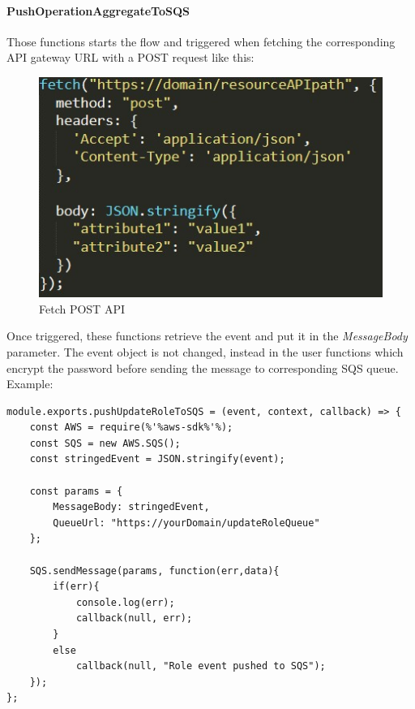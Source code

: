 \paragraph{PushOperationAggregateToSQS} \Spazio
Those functions starts the flow and triggered when fetching the corresponding API gateway URL with a POST request like this: \\
\begin{figure} [H]
	\centering
	\includegraphics[scale=1.2]{../Img/fetchPOST}
	\caption{Fetch POST API}\label{}
\end{figure}
Once triggered, these functions retrieve the event and put it in the \emph{MessageBody} parameter. The event object is not changed, instead in the user functions which encrypt the password before sending the message to corresponding SQS queue.\\
Example:
\begin{lstlisting}[escapechar=\%]
module.exports.pushUpdateRoleToSQS = (event, context, callback) => {
	const AWS = require(%'%aws-sdk%'%);
	const SQS = new AWS.SQS();
	const stringedEvent = JSON.stringify(event);
	
	const params = {
		MessageBody: stringedEvent,
		QueueUrl: "https://yourDomain/updateRoleQueue"
	};
	
	SQS.sendMessage(params, function(err,data){
		if(err){
			console.log(err);
			callback(null, err);
		}
		else
			callback(null, "Role event pushed to SQS");
	});
};
\end{lstlisting}


